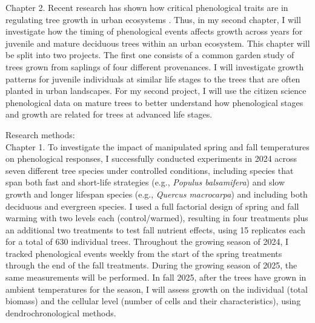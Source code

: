 \documentclass[11pt,letter]{article}
\begin{document}
Chapter 2. Recent research has shown how critical phenological traits are in regulating tree growth in urban ecosystems \citep{simovic_functional_2024}. Thus, in my second chapter, I will investigate how the timing of phenological events affects growth across years for juvenile and mature deciduous trees within an urban ecosystem. This chapter will be split into two projects. The first one consists of a common garden study of trees grown from saplings of four different provenances. I will investigate growth patterns for juvenile individuals at similar life stages to the trees that are often planted in urban landscapes. For my second project, I will use the citizen science phenological data on mature trees to better understand how phenological stages and growth are related for trees at advanced life stages.

\par
Research methods: \\ 
Chapter 1. To investigate the impact of manipulated spring and fall temperatures on phenological responses, I successfully conducted experiments in 2024 across seven different tree species under controlled conditions, including species that span both fast and short-life strategies (e.g., \textit{Populus balsamifera}) and slow growth and longer lifespan species (e.g., \textit{Quercus macrocarpa}) and including both deciduous and evergreen species. \citep{jonsson_annual_2010}  I used a full factorial design of spring and fall warming with two levels each (control/warmed), resulting in four treatments plus an additional two treatments to test fall nutrient effects, using 15 replicates each for a total of 630 individual trees. Throughout the growing season of 2024, I tracked phenological events weekly from the start of the spring treatments through the end of the fall treatments. During the growing season of 2025, the same measurements will be performed. In fall 2025, after the trees have grown in ambient temperatures for the season, I will assess growth on the individual (total biomass) and the cellular level (number of cells and their characteristics), using dendrochronological methods.
\par
\end{document}
